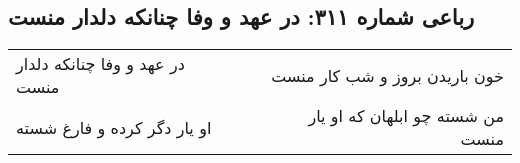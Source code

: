 \begin{center}
\section*{رباعی شماره ۳۱۱: در عهد و وفا چنانکه دلدار منست}
\label{sec:0311}
\begin{longtable}{l p{0.5cm} r}
در عهد و وفا چنانکه دلدار منست
&&
خون باریدن بروز و شب کار منست
\\
او یار دگر کرده و فارغ شسته
&&
من شسته چو ابلهان که او یار منست
\\
\end{longtable}
\end{center}
